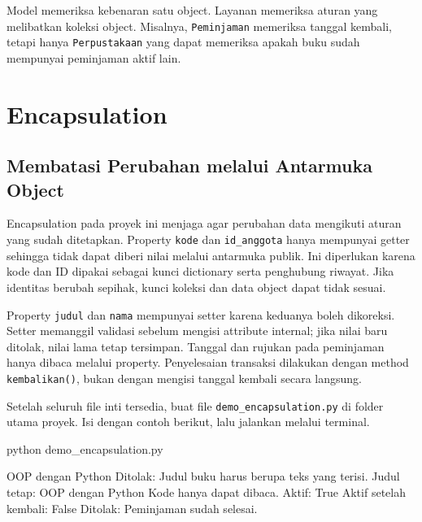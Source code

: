 \begin{tips}
Model memeriksa kebenaran satu object. Layanan memeriksa aturan yang melibatkan koleksi object. Misalnya, \texttt{Peminjaman} memeriksa tanggal kembali, tetapi hanya \texttt{Perpustakaan} yang dapat memeriksa apakah buku sudah mempunyai peminjaman aktif lain.
\end{tips}

\section{Encapsulation}

\subsection{Membatasi Perubahan melalui Antarmuka Object}

Encapsulation pada proyek ini menjaga agar perubahan data mengikuti aturan yang sudah ditetapkan. Property \texttt{kode} dan \texttt{id\_anggota} hanya mempunyai getter sehingga tidak dapat diberi nilai melalui antarmuka publik. Ini diperlukan karena kode dan ID dipakai sebagai kunci dictionary serta penghubung riwayat. Jika identitas berubah sepihak, kunci koleksi dan data object dapat tidak sesuai.

Property \texttt{judul} dan \texttt{nama} mempunyai setter karena keduanya boleh dikoreksi. Setter memanggil validasi sebelum mengisi attribute internal; jika nilai baru ditolak, nilai lama tetap tersimpan. Tanggal dan rujukan pada peminjaman hanya dibaca melalui property. Penyelesaian transaksi dilakukan dengan method \texttt{kembalikan()}, bukan dengan mengisi tanggal kembali secara langsung.

Setelah seluruh file inti tersedia, buat file \texttt{demo\_encapsulation.py} di folder utama proyek. Isi dengan contoh berikut, lalu jalankan melalui terminal.

\begin{keluaran}
python demo_encapsulation.py
\end{keluaran}

\begin{kode}
\end{kode}

\begin{keluaran}
[B001] OOP dengan Python
Ditolak: Judul buku harus berupa teks yang terisi.
Judul tetap: OOP dengan Python
Kode hanya dapat dibaca.
Aktif: True
Aktif setelah kembali: False
Ditolak: Peminjaman sudah selesai.
\end{keluaran}

